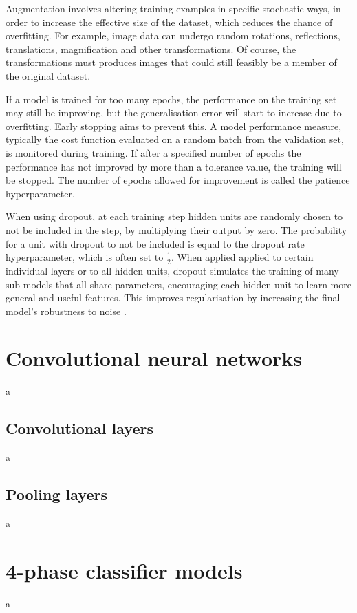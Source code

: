 \documentclass[12pt]{article}
\begin{document}
Augmentation involves altering training examples in specific stochastic ways, in order to increase the effective size of the dataset, which reduces the chance of overfitting. For example, image data can undergo random rotations, reflections, translations, magnification and other transformations. Of course, the transformations must produces images that could still feasibly be a member of the original dataset.

If a model is trained for too many epochs, the performance on the training set may still be improving, but the generalisation error will start to increase due to overfitting. Early stopping aims to prevent this. A model performance measure, typically the cost function evaluated on a random batch from the validation set, is monitored during training. If after a specified number of epochs the performance has not improved by more than a tolerance value, the training will be stopped. The number of epochs allowed for improvement is called the patience hyperparameter.

When using dropout, at each training step hidden units are randomly chosen to not be included in the step, by multiplying their output by zero. The probability for a unit with dropout to not be included is equal to the dropout rate hyperparameter, which is often set to $\frac{1}{2}$. When applied applied to certain individual layers or to all hidden units, dropout simulates the training of many sub-models that all share parameters, encouraging each hidden unit to learn more general and useful features. This improves regularisation by increasing the final model's robustness to noise \cite{Srivastava2014}.

\section{Convolutional neural networks}
a
\subsection{Convolutional layers}
a
\subsection{Pooling layers}
a
\section{4-phase classifier models}
a
\end{document}
